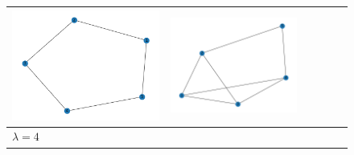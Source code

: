 \documentclass[11pt,a4paper,openright,oneside]{book}
\numberwithin{equation}{section}
\begin{document}
{\begin{figure}[h]
\begin{adjustwidth}{-3cm}{-3cm}
\begin{tabular}{>{\centering\arraybackslash}m{1.5cm} m{2.5cm} m{2.5cm} m{2.5cm} m{2.5cm} m{2.5cm}}
        \rule{0pt}{0.01cm} \includegraphics[width=\linewidth]{media/tnale/graph-4-tnale-2.png} \rule{0pt}{0.01cm}&
        \rule{0pt}{0.01cm} \includegraphics[width=\linewidth]{media/tnale/graph-5-tnale-2.png} \rule{0pt}{0.01cm}\\ \hline
        $\lambda = 4$ &

\end{tabular}
\end{adjustwidth}
\end{figure}}
\end{document}

